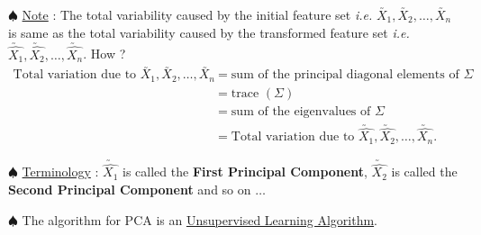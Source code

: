 \documentclass[11pt, a4paper]{article}
\begin{document}
$\spadesuit$ \underline{Note} : The total variability caused by the initial feature set \textit{i.e.} $\utilde{X_1}, \utilde{X_2}, \ldots, \utilde{X_n}$ is same as the total variability caused by the transformed feature set \textit{i.e.} $\utilde{\hat{X_1}}, \utilde{\hat{X_2}}, \ldots, \utilde{\hat{X_n}}$. How ? 
\begin{align*}
\text{Total variation due to } \utilde{X_1}, \utilde{X_2}, \ldots, \utilde{X_n} &= \text{sum of the principal diagonal elements of } \Sigma \\[0.75em]
&= \text{trace }(\Sigma) \\[0.75em]
&= \text{sum of the eigenvalues of }\Sigma \\[0.75em]
&= \text{Total variation due to } \utilde{\hat{X_1}}, \utilde{\hat{X_2}}, \ldots, \utilde{\hat{X_n}}.
\end{align*}


$\spadesuit$ \underline{Terminology} : $\utilde{\hat{X_1}}$ is called the \textbf{First Principal Component}, $\utilde{\hat{X_2}}$ is called the \textbf{Second Principal Component} and so on $\ldots$ \\

\vspace{0.3cm}

$\spadesuit$ The algorithm for PCA is an \underline{Unsupervised Learning Algorithm}.
\end{document}

